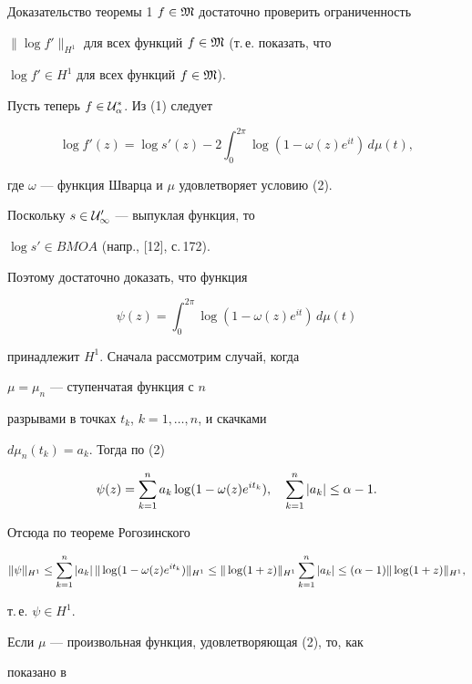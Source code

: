 \begin{pf*}{Доказательство теоремы 1}
$f\in\frak M$ достаточно проверить ограниченность


$\|\log f'\|_{H^1}$ для всех функций $f\in\frak M$ (т.\,е. показать, что


$\log f'\in H^1$ для всех функций $f\in\frak M$).





Пусть теперь $f\in\cal U_\alpha^\ast$. Из (1) следует


$$


\log f'(z)=\log s'(z)-2\int_0^{2\pi}\log(1-\omega(z)e^{it})\, d\mu(t),


$$


где $\omega$ --- функция Шварца и $\mu$ удовлетворяет условию (2).


Поскольку $s\in \cal U_1'$ --- выпуклая функция, то


$\log s'\in BMOA$ (напр., [12], с.\,172).


Поэтому достаточно доказать, что функция


$$


\psi(z)=\int_0^{2\pi}\log(1-\omega(z)e^{it})\, d\mu(t)


$$


принадлежит $H^1$. Сначала рассмотрим случай, когда


$\mu=\mu_n$ --- ступенчатая функция с $n$


разрывами в точках $t_k$, $k=1,\dotsc, n$, и скачками


$d\mu_n(t_k)=a_k$. Тогда по (2)


$$


\psi(z)=\sum_{k=1}^na_k\log (1-\omega(z)e^{it_k}), \quad


\sum_{k=1}^n|a_k|\leq\al -1.


$$


Отсюда по теореме Рогозинского


$$


\|\psi\|_{H^1}\leq\sum_{k=1}^n|a_k|\, \|\log


(1-\omega(z)e^{it_k})\|_{H^1}\leq


\|\log (1+z)\|_{H^1}\sum_{k=1}^n|a_k|\leq


(\al-1)\|\log (1+z)\|_{H^1},


$$


т.\,е. $\psi\in H^1$.





Если $\mu$ --- произвольная функция, удовлетворяющая (2), то, как


показано в



\end{pf*}
